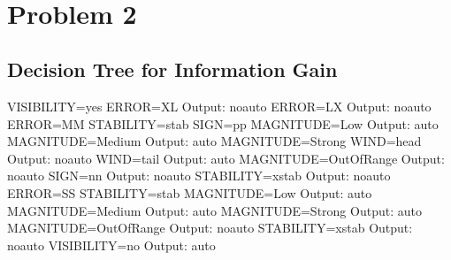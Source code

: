 \documentclass[]{article}   %
\begin{document}
 \begin{figure}[H]
    \centering
    \mbox{
        \quad{}\quad{}\quad{}}\end{figure}
 \begin{figure}[H]
    \centering
    \mbox{
        \quad{}\quad{}\quad{}}\end{figure}
 \begin{figure}[H]
    \centering
    \mbox{
        \quad{}\quad{}\quad{}}\end{figure}
 \begin{figure}[H]
    \centering
    \mbox{
        \quad{}\quad{}\quad{}}\end{figure}
\section{Problem 2}
\subsection{Decision Tree for Information Gain}
\begin{verbatimtab}[8]
  VISIBILITY=yes
    ERROR=XL
      Output: noauto
    ERROR=LX
      Output: noauto
    ERROR=MM
      STABILITY=stab
        SIGN=pp
          MAGNITUDE=Low
            Output: auto
          MAGNITUDE=Medium
            Output: auto
          MAGNITUDE=Strong
            WIND=head
              Output: noauto
            WIND=tail
              Output: auto
          MAGNITUDE=OutOfRange
            Output: noauto
        SIGN=nn
          Output: noauto
      STABILITY=xstab
        Output: noauto
    ERROR=SS
      STABILITY=stab
        MAGNITUDE=Low
          Output: auto
        MAGNITUDE=Medium
          Output: auto
        MAGNITUDE=Strong
          Output: auto
        MAGNITUDE=OutOfRange
          Output: noauto
      STABILITY=xstab
        Output: noauto
  VISIBILITY=no
    Output: auto
\end{verbatimtab}
\end{document}
